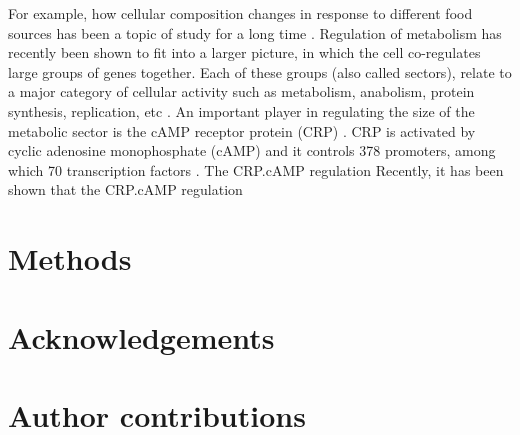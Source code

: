 For example, how cellular composition changes in response to different food sources has been a topic of study for a long time \cite{Schaechter1958}.
%
Regulation of metabolism has recently been shown to fit into a larger picture, in which the cell co-regulates large groups of genes together.
Each of these groups (also called sectors), relate to a major 
%
category of cellular activity such as 
metabolism, anabolism, protein synthesis, replication, etc 
\cite{Klumpp2009, You2013, Scott2014, Hui2015, Hermsen2015, Erickson2017}.
%
%
An important player in regulating the size of the metabolic sector is the cAMP receptor protein (CRP) \cite{Keseler2017, Grainger2005, Robinson1998, Zheng2004, Gorke2008, Fic2009, Green2014}.
%
CRP is activated by cyclic adenosine monophosphate (cAMP) and it controls 378 promoters, among which 70 transcription factors \cite{Green2014, Shimada2011}.
%
The CRP.cAMP regulation 
%
Recently, it has been shown that the CRP.cAMP regulation 

%
% 

\section{Methods}


\section{Acknowledgements}

\section{Author contributions}

